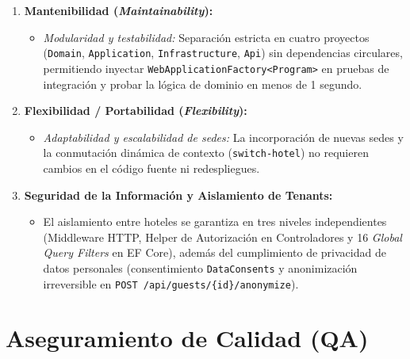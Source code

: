 \documentclass[12pt,a4paper]{article}
\begin{document}
\begin{enumerate}
    \item \textbf{Mantenibilidad (\textit{Maintainability}):}
    \begin{itemize}
        \item \textit{Modularidad y testabilidad:} Separaci\'on estricta en cuatro proyectos (\texttt{Domain}, \texttt{Application}, \texttt{Infrastructure}, \texttt{Api}) sin dependencias circulares, permitiendo inyectar \texttt{WebApplicationFactory<Program>} en pruebas de integraci\'on y probar la l\'ogica de dominio en menos de 1 segundo.
    \end{itemize}

    \item \textbf{Flexibilidad / Portabilidad (\textit{Flexibility}):}
    \begin{itemize}
        \item \textit{Adaptabilidad y escalabilidad de sedes:} La incorporaci\'on de nuevas sedes y la conmutaci\'on din\'amica de contexto (\texttt{switch-hotel}) no requieren cambios en el c\'odigo fuente ni redespliegues.
    \end{itemize}

    \item \textbf{Seguridad de la Informaci\'on y Aislamiento de Tenants:}
    \begin{itemize}
        \item El aislamiento entre hoteles se garantiza en tres niveles independientes (Middleware HTTP, Helper de Autorizaci\'on en Controladores y 16 \textit{Global Query Filters} en EF Core), adem\'as del cumplimiento de privacidad de datos personales (consentimiento \texttt{DataConsents} y anonimizaci\'on irreversible en \texttt{POST /api/guests/\{id\}/anonymize}).
    \end{itemize}
\end{enumerate}

\section{Aseguramiento de Calidad (QA)}
\end{document}
